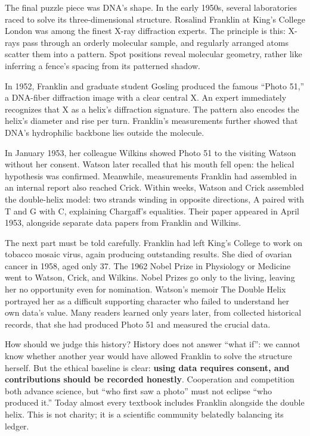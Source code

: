 \begin{zhengju}
The final puzzle piece was DNA's shape. In the early 1950s, several laboratories raced to solve its three-dimensional structure. Rosalind Franklin at King's College London was among the finest X-ray diffraction experts. The principle is this: X-rays pass through an orderly molecular sample, and regularly arranged atoms scatter them into a pattern. Spot positions reveal molecular geometry, rather like inferring a fence's spacing from its patterned shadow.

In 1952, Franklin and graduate student Gosling produced the famous ``Photo 51,'' a DNA-fiber diffraction image with a clear central X. An expert immediately recognizes that X as a helix's diffraction signature. The pattern also encodes the helix's diameter and rise per turn. Franklin's measurements further showed that DNA's hydrophilic backbone lies outside the molecule.

In January 1953, her colleague Wilkins showed Photo 51 to the visiting Watson without her consent. Watson later recalled that his mouth fell open: the helical hypothesis was confirmed. Meanwhile, measurements Franklin had assembled in an internal report also reached Crick. Within weeks, Watson and Crick assembled the double-helix model: two strands winding in opposite directions, A paired with T and G with C, explaining Chargaff's equalities. Their paper appeared in April 1953, alongside separate data papers from Franklin and Wilkins.

The next part must be told carefully. Franklin had left King's College to work on tobacco mosaic virus, again producing outstanding results. She died of ovarian cancer in 1958, aged only 37. The 1962 Nobel Prize in Physiology or Medicine went to Watson, Crick, and Wilkins. Nobel Prizes go only to the living, leaving her no opportunity even for nomination. Watson's memoir The Double Helix portrayed her as a difficult supporting character who failed to understand her own data's value. Many readers learned only years later, from collected historical records, that she had produced Photo 51 and measured the crucial data.

How should we judge this history? History does not answer ``what if'': we cannot know whether another year would have allowed Franklin to solve the structure herself. But the ethical baseline is clear: \textbf{using data requires consent, and contributions should be recorded honestly}. Cooperation and competition both advance science, but ``who first saw a photo'' must not eclipse ``who produced it.'' Today almost every textbook includes Franklin alongside the double helix. This is not charity; it is a scientific community belatedly balancing its ledger.
\end{zhengju}

